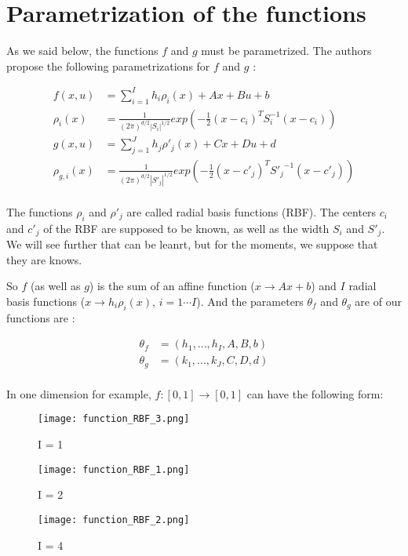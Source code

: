\section{Parametrization of the functions}

As we said below, the functions $f$ and $g$ must be parametrized.
The authors propose the following parametrizations for $f$ and $g$ :

\begin{align*}
  f(x,u) &= \sum_{i=1}^I h_i \rho_i(x) + Ax + Bu + b\\
  \rho_i(x) &= \frac{1}{(2\pi)^{d/2}|S_i|^{1/2}} exp\left(-\frac{1}{2}(x-c_i)^T S_{i}^{-1}(x-c_i)\right)\\
  g(x,u) &= \sum_{j=1}^J h_j \rho'_j(x) + Cx + Du + d\\
  \rho_{g,i}(x) &= \frac{1}{(2\pi)^{d/2}|S'_j|^{1/2}} exp\left(-\frac{1}{2}(x-c'_j)^T {S'_{j}}^{-1}(x-c'_j)\right)\\
\end{align*}

The functions $\rho_i$ and $\rho'_j$ are called radial basis functions (RBF).
The centers $c_i$ and $c'_j$ of the RBF are supposed to be known, as well as the width $S_i$ and $S'_j$.
We will see further that can be leanrt, but for the moments, we suppose that they are knows.


So $f$ (as well as $g$) is the sum of an affine function ($x \rightarrow Ax + b$) and $I$ radial basis functions ($x \rightarrow h_i\rho_i(x)$, $i=1 \cdots I$).
And the parameters $\theta_f$ and $\theta_g$ are of our functions are :

\begin{align*}
  \theta_f &= \left( h_1, ..., h_I, A, B, b\right) \\
  \theta_g &= \left( k_1, ..., k_J, C, D, d\right) \\
\end{align*}

In one dimension for example, $f : \left[0,1\right] \rightarrow \left[0,1\right]$ can have the following form:

\begin{figure}[H]
\captionsetup{labelformat=empty}
  \texttt{[image: function\_RBF\_3.png]}
  \caption{I = 1}
\endminipage\hfill
{}
  \texttt{[image: function\_RBF\_1.png]}
  \caption{I = 2}
\endminipage\hfill
{}
  \texttt{[image: function\_RBF\_2.png]}
  \caption{I = 4}
\endminipage\hfill
\end{figure}
